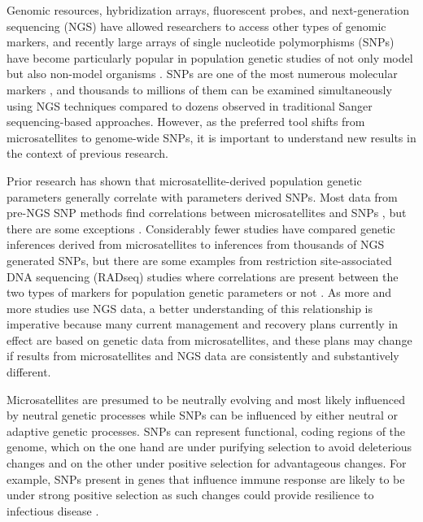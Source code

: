 \documentclass[english]{article}\usepackage[]{graphicx}\usepackage[]{color}
\begin{document}
Genomic resources, hybridization arrays, fluorescent probes, and next-generation sequencing (NGS) have allowed researchers to access other types of genomic markers, and recently large arrays of single nucleotide polymorphisms (SNPs) have become particularly popular in population genetic studies of not only model but also non-model organisms \citep{Allendorf_et_al_2010}. SNPs are one of the most numerous molecular markers \citep{Gupta_et_al_2001}, and thousands to millions of them can be examined simultaneously using NGS techniques compared to dozens observed in traditional Sanger sequencing-based approaches. However, as the preferred tool shifts from microsatellites to genome-wide SNPs, it is important to understand new results in the context of previous research. 

Prior research has shown that microsatellite-derived population genetic parameters generally correlate with parameters derived SNPs. Most data from pre-NGS SNP methods find correlations between microsatellites and SNPs \citep[e.g.,][]{Ryynanen_et_al_2007, Narum_et_al_2008, Coates_et_al_2009, Glover_et_al_2010, Garke_et_al_2012}, but there are some exceptions \citep[e.g.,][]{Vali_et_al_2008, DeFaveri_et_al_2013}. Considerably fewer studies have compared genetic inferences derived from microsatellites to inferences from thousands of NGS generated SNPs, but there are some examples from restriction site-associated DNA sequencing (RADseq) studies where correlations are present \citep{Jeffries_et_al_2016} between the two types of markers for population genetic parameters  or not \citep{Lozier_2014}. As more and more studies use NGS data, a better understanding of this relationship is imperative because many current management and recovery plans currently in effect are based on genetic data from microsatellites, and these plans may change if results from microsatellites and NGS data are consistently and substantively different.

Microsatellites are presumed to be neutrally evolving and most likely influenced by neutral genetic processes while SNPs can be influenced by either neutral or adaptive genetic processes. SNPs can represent functional, coding regions of the genome, which on the one hand are under purifying selection to avoid deleterious changes and on the other under positive selection for advantageous changes. For example, SNPs present in genes that influence immune response are likely to be under strong positive selection as such changes could provide resilience to infectious disease \citep{Bernatchez_and_Landry_2003, Sommer_2005}.
\end{document}
